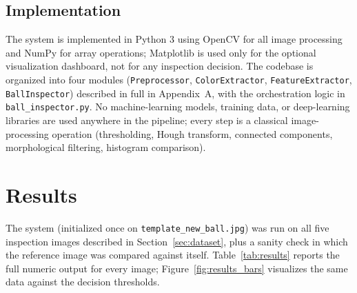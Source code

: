 \documentclass[11pt,a4paper]{article}
\begin{document}
\subsection{Implementation}

The system is implemented in Python 3 using OpenCV for all image
processing and NumPy for array operations; Matplotlib is used only for the
optional visualization dashboard, not for any inspection decision. The
codebase is organized into four modules (\texttt{Preprocessor},
\texttt{ColorExtractor}, \texttt{FeatureExtractor}, \texttt{BallInspector})
described in full in Appendix~A, with the orchestration logic in
\texttt{ball\_inspector.py}. No machine-learning models, training data, or
deep-learning libraries are used anywhere in the pipeline; every step is a
classical image-processing operation (thresholding, Hough transform,
connected components, morphological filtering, histogram comparison).

\section{Results}

The system (initialized once on \texttt{template\_new\_ball.jpg}) was run
on all five inspection images described in Section~\ref{sec:dataset}, plus
a sanity check in which the reference image was compared against itself.
Table~\ref{tab:results} reports the full numeric output for every image;
Figure~\ref{fig:results_bars} visualizes the same data against the decision
thresholds.
\end{document}
